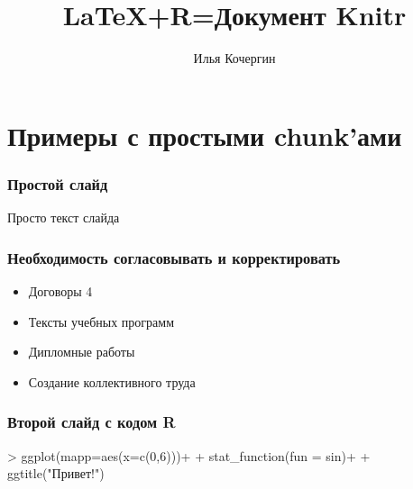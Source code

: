 \documentclass[10pt,pdf]{beamer}
\title{LaTeX+R=Документ Knitr}
\author{Илья Кочергин}
\institute{кафедра экономической информатики ЭФ МГУ}
\begin{document}

\begin{frame}

\titlepage
\end{frame}	
\section[простые примеры]{Примеры с простыми chunk'ами}
\begin{frame}
\frametitle{Простой слайд}
 Просто текст слайда 
 \begin{itemize}
 
 \end{itemize}
 

\end{frame}


\begin{frame}
	\frametitle{Необходимость согласовывать и корректировать}
\begin{itemize}
\item 	Договоры 4
\item 	Тексты учебных программ
\item 	Дипломные работы 
\item 	Создание коллективного  труда
\end{itemize} 
\end{frame}


\begin{frame}[fragile]
\frametitle{Второй слайд с кодом R}    

\begin{Schunk}
\begin{Sinput}
>   ggplot(mapp=aes(x=c(0,6)))+
+   stat_function(fun = sin)+
+   ggtitle("Привет!")
\end{Sinput}
\end{Schunk}

\end{frame}
\end{document}
